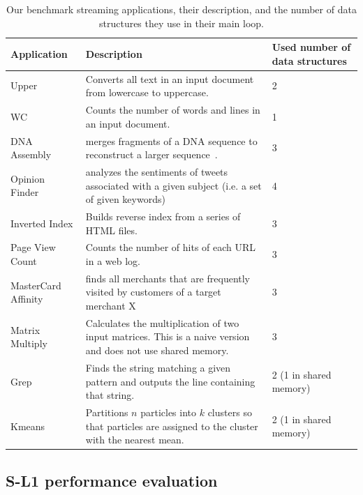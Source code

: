 \begin{table}[ht]
{
\begin{center}
\resizebox{17cm}{2.1cm}
{
  \begin{tabular}{|p{2.8cm}|p{14.4cm}|p{3.5cm}|} \hline
         {\bf Application} & {\bf Description} &  {\bf Used number of data structures}\\
\hline
	  {Upper} &   {Converts all text in an input document from lowercase to uppercase.} &  {2}\\  \hline
	  {WC} &   {Counts the number of words and lines in an input document.} &  {1}\\ \hline
	  {DNA Assembly} & {merges fragments of a DNA sequence to reconstruct a larger sequence~\cite{dnaassembly}.} & {3}\\ \hline
	  {Opinion Finder} & {analyzes the sentiments of tweets associated with a given subject (i.e. a set of given keywords)~\cite{wilson2005opinionfinder}} &  {4}\\ \hline
	  {Inverted Index} & {Builds reverse index from a series of HTML files.} & {3}\\ \hline
	  {Page View Count} & {Counts the number of hits of each URL in a web log.} & {3}\\ \hline
          {MasterCard Affinity} & {finds all merchants that are frequently visited by customers of a target merchant X~\cite{}} & {3}\\ \hline
	  {Matrix Multiply} & {Calculates the multiplication of two input matrices. This is a naive version and does not use shared memory.} & {3}\\ \hline
	  {Grep} & {Finds the string matching a given pattern and outputs the line containing that string.} & {2 (1 in shared memory)}\\ \hline
	  {Kmeans} & {Partitions $n$ particles into $k$ clusters so that particles are assigned to the cluster with the nearest mean.} & {2 (1 in shared memory)}\\ \hline
  \end{tabular}
}
\end{center}
}
\vspace{-0.0cm}
\caption{Our benchmark streaming applications, their description, and the number of data structures they use in their main loop.} %
\label{tab:apps}
\vspace{-0.0cm}
\end{table}

\subsection{S-L1 performance evaluation}

